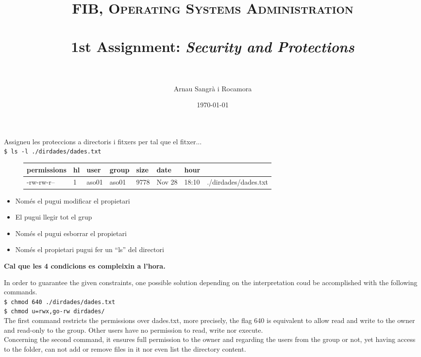 \documentclass[10pt,a4paper]{article}
\title{
	\normalfont \normalsize 
	\textsc{FIB, Operating Systems Administration} \\ [25pt] %
	\horrule{0.5pt} \\[0.4cm] %
	\huge 1st Assignment: \textit{Security and Protections}\\ %
	\horrule{2pt} \\[0.5cm] %
}
\author{Arnau Sangrà i Rocamora}
\date{\normalsize\today} %
\begin{document}
	\maketitle
	
	Assigneu les proteccions a directoris i fitxers per tal que el fitxer...\\
	\texttt{\$ ls -l ./dirdades/dades.txt}
	
	\begin{figure}[H]
		\begin{tabular}{llllllll}
		permissions & hl & user & group & size & date & hour &  \\  \hline
		-rw-rw-r-- & 1  & aso01  & aso01  & 9778 & Nov 28 & 18:10  & ./dirdades/dades.txt \\ 
		\end{tabular}
	\end{figure}
	
	\begin{itemize}
		\item 	Només el pugui modificar el propietari
		\item 	El pugui llegir tot el grup
		\item 	Només el pugui esborrar el propietari
		\item 	Només el propietari pugui fer un “ls” del directori
	\end{itemize}
	\begin{center}
		\textbf{Cal que les 4 condicions es compleixin a l'hora.}
	\end{center}
	\color{darkblue}In order to guarantee the given constraints, one possible solution depending on the interpretation coud be accomplished with the following commands.\\
	
	\texttt{\$ chmod 640 ./dirdades/dades.txt}\\
	\texttt{\$ chmod u=rwx,go-rw dirdades/}\\
	
	The first command restricts the permissions over dades.txt, more precisely, the flag 640 is equivalent to allow read and write to the owner and read-only to the group. Other users have no permission to read, write nor execute.\\
	Concerning the second command, it ensures full permission to the owner and regarding the users from the group or not, yet having access to the folder, can not add or remove files in it nor even list the directory content.
\end{document}

